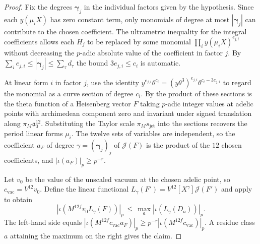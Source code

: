 \begin{proof}
Fix the degrees $\boldsymbol\gamma_j$ in the individual factors given by the hypothesis. Since each $y(\mu_i X)$ has zero constant term, only monomials of degree at most $|\boldsymbol\gamma_j|$ can contribute to the chosen coefficient. The ultrametric inequality for the integral coefficients allows each $H_j$ to be replaced by some monomial $\prod_i y(\mu_i X)^{e_{j,i}}$ without decreasing the $p$-adic absolute value of the coefficient in factor $j$. By $\sum_i e_{j,i}\le|\boldsymbol\gamma_j|\le\sum_\tau d_\tau$ the bound $3e_{j,i}\le c_i$ is automatic.

At linear form $i$ in factor $j$, use the identity $y^{e_{j,i}}\theta^{c_i}=(y\theta^3)^{e_{j,i}}\theta^{c_i-3e_{j,i}}$ to regard the monomial as a curve section of degree $c_i$. By  the product of these sections is the theta function of a Heisenberg vector $F$ taking $p$-adic integer values at adelic points with archimedean component zero and invariant under signed translation along $\pi_M\mathfrak a_0^{12}$. Substituting the Taylor scale $\pi_M s_{\mathrm{jet}}$ into the sections recovers the period linear forms $\mu_i$. The twelve sets of variables are independent, so the coefficient $a_F$ of degree $\gamma=(\boldsymbol\gamma_j)_j$ of $\mathcal J(F)$ is the product of the $12$ chosen coefficients, and $|\iota(a_F)|_p\ge p^{-r}$.

Let $v_0$ be the value of the unscaled vacuum at the chosen adelic point, so $c_{\mathrm{vac}}=V^{12}v_0$. Define the linear functional $L_\gamma(F')=V^{12}[X^\gamma]\mathcal J(F')$ and apply  to obtain
\[
 |\iota(M^{12f}v_0 L_\gamma(F))|_p
 \,\le\,\max_a|\iota(L_\gamma(D_a))|_p .
\]
The left-hand side equals $|\iota(M^{12f} c_{\mathrm{vac}}a_F)|_p\ge p^{-r}|\iota(M^{12f}c_{\mathrm{vac}})|_p$. A residue class $a$ attaining the maximum on the right gives the claim.
\end{proof}

